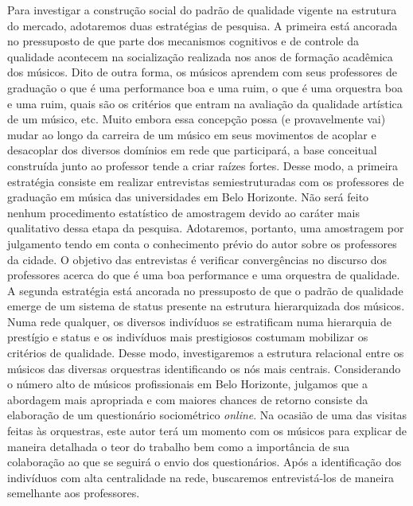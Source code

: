 \documentclass[a4paper, 12pt, openright, oneside, german, french, english, brazil]{abntex2}
\begin{document}
	Para investigar a construção social do padrão de qualidade vigente na estrutura do mercado, adotaremos duas estratégias de pesquisa. A primeira está ancorada no pressuposto de que parte dos mecanismos cognitivos e de controle da qualidade acontecem na socialização realizada nos anos de formação acadêmica dos músicos. Dito de outra forma, os músicos aprendem com seus professores de graduação o que é uma performance boa e uma ruim, o que é uma orquestra boa e uma ruim, quais são os critérios que entram na avaliação da qualidade artística de um músico, etc. Muito embora essa concepção possa (e provavelmente vai) mudar ao longo da carreira de um músico em seus movimentos de acoplar e desacoplar dos diversos domínios em rede que participará, a base conceitual construída junto ao professor tende a criar raízes fortes. Desse modo, a primeira estratégia consiste em realizar entrevistas semiestruturadas com os professores de graduação em música das universidades em Belo Horizonte. Não será feito nenhum procedimento estatístico de amostragem devido ao caráter mais qualitativo dessa etapa da pesquisa. Adotaremos, portanto, uma amostragem por julgamento tendo em conta o conhecimento prévio do autor sobre os professores da cidade. O objetivo das entrevistas é verificar convergências no discurso dos professores acerca do que é uma boa performance e uma orquestra de qualidade. A segunda estratégia está ancorada no pressuposto de que o padrão de qualidade emerge de um sistema de status presente na estrutura hierarquizada dos músicos. Numa rede qualquer, os diversos indivíduos se estratificam numa hierarquia de prestígio e status e os indivíduos mais prestigiosos costumam mobilizar os critérios de qualidade. Desse modo, investigaremos a estrutura relacional entre os músicos das diversas orquestras identificando os nós mais centrais. Considerando o número alto de músicos profissionais em Belo Horizonte, julgamos que a abordagem mais apropriada e com maiores chances de retorno consiste da elaboração de um questionário sociométrico \textit{online}. Na ocasião de uma das visitas feitas às orquestras, este autor terá um momento com os músicos para explicar de maneira detalhada o teor do trabalho bem como a importância de sua colaboração ao que se seguirá o envio dos questionários. Após a identificação dos indivíduos com alta centralidade na rede, buscaremos entrevistá-los de maneira semelhante aos professores.



\end{document}
